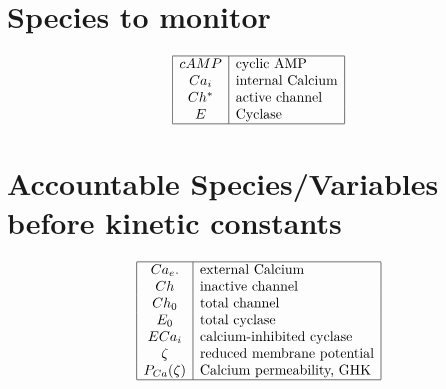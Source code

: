 \documentclass[aps,12pt]{revtex4}
\begin{document}
\section{Species to monitor}
\begin{equation*}
\begin{array}{|c|l|}
\hline
	cAMP & \text{cyclic AMP}\\
	Ca_i & \text{internal Calcium}\\
    Ch^\ast & \text{active channel}\\
    E     & \text{Cyclase} \\	
\hline
\end{array}
\end{equation*}

\section{Accountable Species/Variables before kinetic constants}

\begin{equation*}
\begin{array}{|c|l|}
\hline
	Ca_e. & \text{external Calcium}\\
    Ch    & \text{inactive channel}\\
    Ch_0  & \text{total channel}\\
    E_0   & \text{total cyclase} \\	
    ECa_i & \text{calcium-inhibited cyclase}\\
    \zeta & \text{reduced membrane potential}\\
    P_{Ca}(\zeta) & \text{Calcium permeability, GHK}\\
\hline
\end{array}
\end{equation*}
\end{document}
